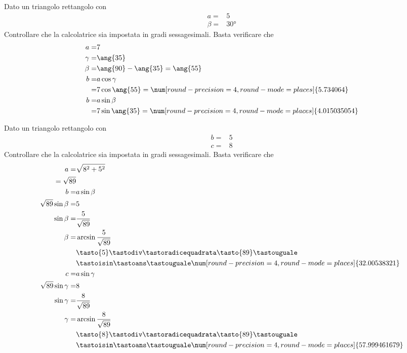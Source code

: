   \begin{exercise}
  	Dato un triangolo rettangolo con
  	\begin{align*}
  	a=&5\\
  	\beta=&\ang{30}
  	\end{align*}
  	\tcblower
  	Controllare che la calcolatrice sia impostata in gradi sessagesimali.
  	Basta verificare che \testgradi 
  	\begin{align*}
  	a=& 7\\
  	\gamma=&\ang{35}\\
  	\beta=&\ang{90}-\ang{35}=\ang{55}\\
  	b=&a\cos\gamma\\
  	=& 7\cos\ang{55}=\num[round-precision=\lungarrotandamento,round-mode=places]{5.734064}\\
  	b=&a\sin\beta\\
  	=& 7\sin\ang{35}=\num[round-precision=\lungarrotandamento,round-mode=places]{4.015035054}
  	\end{align*}
  \end{exercise}
\begin{exercise}
	Dato un triangolo rettangolo con
	\begin{align*}
	b=&5\\
	c=&8
	\end{align*}
	\tcblower
	Controllare che la calcolatrice sia impostata in gradi sessagesimali.
	Basta verificare che \testgradi 
	\begin{align*}
	a=&\sqrt{8^2+5^2}\\
	=\sqrt{89}\\
	b=&a\sin\beta\\
	\sqrt{89}\sin\beta=&5\\
	\sin\beta=&\frac{5}{\sqrt{89}}\\
	\beta=&\arcsin\frac{5}{\sqrt{89}}\\
	&\tasto{5}\tastodiv\tastoradicequadrata\tasto{89}\tastouguale\\
	&\tastoisin\tastoans\tastouguale
	\num[round-precision=\lungarrotandamento,round-mode=places]{32.00538321}\\
	c=&a\sin\gamma\\
\sqrt{89}\sin\gamma=&8\\
\sin\gamma=&\frac{8}{\sqrt{89}}\\
\gamma=&\arcsin\frac{8}{\sqrt{89}}\\
&\tasto{8}\tastodiv\tastoradicequadrata\tasto{89}\tastouguale\\
&\tastoisin\tastoans\tastouguale
\num[round-precision=\lungarrotandamento,round-mode=places]{57.999461679}\\
	\end{align*}
\end{exercise}
